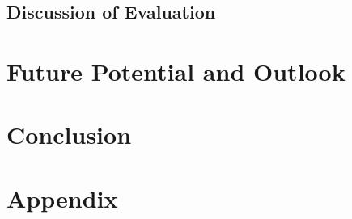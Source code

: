 \documentclass[12pt, a4paper]{article}
\begin{document}
\subsection{Discussion of Evaluation}

\section{Future Potential and Outlook}\label{sec::outlook}
\section{Conclusion}\label{sec::conclusion}


\newpage

\singlespacing{}
\renewcommand{\thesubsection}{\Alph{subsection}}
\setcounter{page}{\value{lastroman}}
\section*{Appendix}


\newpage




\newpage
\listoffigures
\listoftables
\lstlistoflistings{}
\newpage

% 




\end{document}
